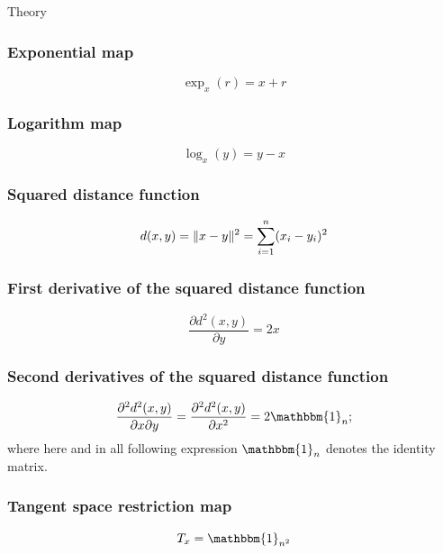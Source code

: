 \begin{chapter}{Theory}
\subsubsection{Exponential map} %
\label{ssub:ExponentialEUC}
\begin{equation}
    \exp_x(r)=x+r    
\end{equation}

\subsubsection{Logarithm map} %
\label{ssub:LogarithEUC}
\begin{equation}
    \log_x(y)=y-x
\end{equation}

\subsubsection{Squared distance function} %
\label{ssub:SquareddistanceEUC}
\begin{equation}
    d(x,y)=\| x-y \|^{2}=\sum_{i=1}^n(x_i-y_i)^{2}
\end{equation}

\subsubsection{First derivative of the squared distance function} %
\label{ssub:FirstDerEUC}
\begin{equation}
    \frac{\partial d^2(x,y)}{\partial y}=2x
\end{equation}

\subsubsection{Second derivatives of the squared distance function} %
\label{ssub:SecondDerEUC}
\begin{equation}
    \frac{\partial^2 d^2(x,y)}{\partial x\partial y}=\frac{\partial^2 d^2(x,y)}{\partial x^2}=2\mathbbm{1}_n;
\end{equation}
where here and in all following expression $\mathbbm{1}_n$ denotes the identity matrix.


\subsubsection{Tangent space restriction map} %
\label{ssub:TangentEUC}
\begin{equation}
    T_x=\mathbbm{1}_{n^2}
\end{equation}


\end{chapter}
